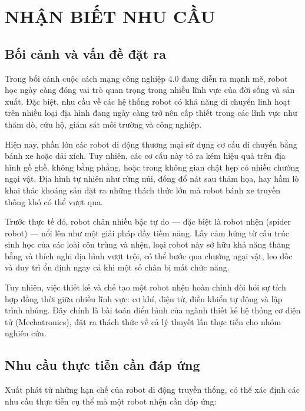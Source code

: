 \chapter{NHẬN BIẾT NHU CẦU}

\section{Bối cảnh và vấn đề đặt ra}

\hspace{0.5cm} Trong bối cảnh cuộc cách mạng công nghiệp 4.0 đang diễn ra mạnh mẽ, robot học ngày càng đóng vai trò quan trọng trong nhiều lĩnh vực của đời sống và sản xuất. Đặc biệt, nhu cầu về các hệ thống robot có khả năng di chuyển linh hoạt trên nhiều loại địa hình đang ngày càng trở nên cấp thiết trong các lĩnh vực như thăm dò, cứu hộ, giám sát môi trường và công nghiệp.

Hiện nay, phần lớn các robot di động thương mại sử dụng cơ cấu di chuyển bằng bánh xe hoặc dải xích. Tuy nhiên, các cơ cấu này tỏ ra kém hiệu quả trên địa hình gồ ghề, không bằng phẳng, hoặc trong không gian chật hẹp có nhiều chướng ngại vật. Địa hình tự nhiên như rừng núi, đống đổ nát sau thảm họa, hay hầm lò khai thác khoáng sản đặt ra những thách thức lớn mà robot bánh xe truyền thống khó có thể vượt qua.

Trước thực tế đó, robot chân nhiều bậc tự do — đặc biệt là robot nhện (spider robot) — nổi lên như một giải pháp đầy tiềm năng. Lấy cảm hứng từ cấu trúc sinh học của các loài côn trùng và nhện, loại robot này sở hữu khả năng thăng bằng và thích nghi địa hình vượt trội, có thể bước qua chướng ngại vật, leo dốc và duy trì ổn định ngay cả khi một số chân bị mất chức năng.

Tuy nhiên, việc thiết kế và chế tạo một robot nhện hoàn chỉnh đòi hỏi sự tích hợp đồng thời giữa nhiều lĩnh vực: cơ khí, điện tử, điều khiển tự động và lập trình nhúng. Đây chính là bài toán điển hình của ngành thiết kế hệ thống cơ điện tử (Mechatronics), đặt ra thách thức về cả lý thuyết lẫn thực tiễn cho nhóm nghiên cứu.

\section{Nhu cầu thực tiễn cần đáp ứng}

\hspace{0.5cm} Xuất phát từ những hạn chế của robot di động truyền thống, có thể xác định các nhu cầu thực tiễn cụ thể mà một robot nhện cần đáp ứng:

